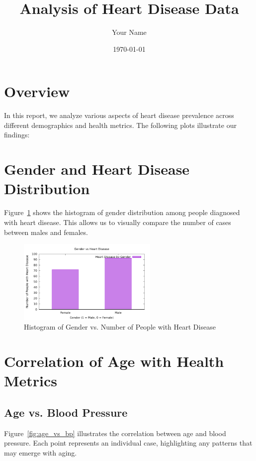 \documentclass{article}
\begin{document}
	
	\title{Analysis of Heart Disease Data}
	\author{Your Name}
	\date{\today}
	\maketitle
	
	\section*{Overview}
	In this report, we analyze various aspects of heart disease prevalence across different demographics and health metrics. The following plots illustrate our findings:
	
	\section{Gender and Heart Disease Distribution}
	Figure~\ref{fig:gender_heart_disease} shows the histogram of gender distribution among people diagnosed with heart disease. This allows us to visually compare the number of cases between males and females.
	
	\begin{figure}[h]
		\centering
		\includegraphics[width=0.6\textwidth]{a.pdf}
		\caption{Histogram of Gender vs. Number of People with Heart Disease}
		\label{fig:gender_heart_disease}
	\end{figure}
	
	\section{Correlation of Age with Health Metrics}
	
	\subsection{Age vs. Blood Pressure}
	Figure~\ref{fig:age_vs_bp} illustrates the correlation between age and blood pressure. Each point represents an individual case, highlighting any patterns that may emerge with aging.
	
\end{document}
